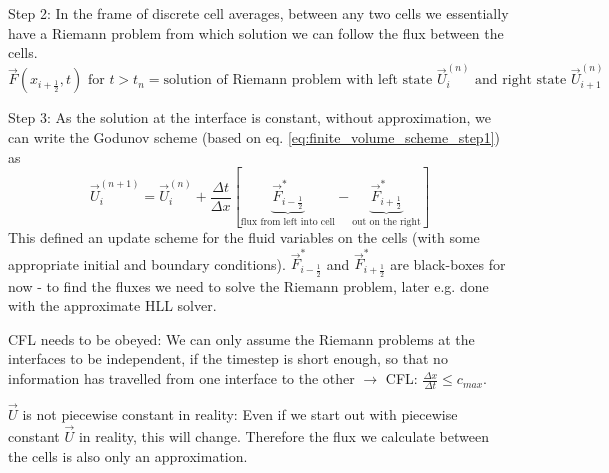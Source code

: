 \textcolor{blue1}{Step 2}: In the frame of discrete cell averages, \textcolor{blue1}{between any two cells we essentially have a Riemann problem from which solution we can follow the flux between the cells}.
\begin{equation}
    \vec{F}(x_{i+\frac{1}{2}},t) \text{ for } t > t_n = \text{solution of Riemann problem with left state } \vec{U}_i^{(n)} \text{ and right state } \vec{U}_{i+1}^{(n)}
\end{equation}
\begin{mdframed}[style=padded]
    \textcolor{blue1}{Step 3}: As the solution at the interface is constant, without approximation, we can write the \textcolor{blue1}{Godunov scheme} (based on eq. \ref{eq:finite_volume_scheme_step1}) as
    \begin{equation}
        \vec{U}_i^{(n+1)}=\vec{U}_i^{(n)}+\frac{\Delta t}{\Delta x}\left[\underbrace{\vec{F}^*_{i-\frac{1}{2}}}_{\text{flux from left into cell}}-\underbrace{\vec{F}^*_{i+\frac{1}{2}}}_{\text{out on the right}}\right]
    \end{equation}
    This defined an update scheme for the fluid variables on the cells (with some appropriate initial and boundary conditions). $\vec{F}^*_{i-\frac{1}{2}}$ and $\vec{F}^*_{i+\frac{1}{2}}$ are black-boxes for now - to find the fluxes we need to solve the Riemann problem, later e.g. done with the approximate HLL solver.
\end{mdframed}

\textcolor{red1}{CFL needs to be obeyed:} We can only assume the Riemann problems at the interfaces to be independent, if the timestep is short enough, so that no information has travelled from one interface to the other $\rightarrow$ CFL: $\frac{\Delta x}{\Delta t} \leq c_{max}$.

\textcolor{red1}{$\vec{U}$ is not piecewise constant in reality:} Even if we start out with piecewise constant $\vec{U}$ in reality, this will change. Therefore the flux we calculate between the cells is also only an approximation.

